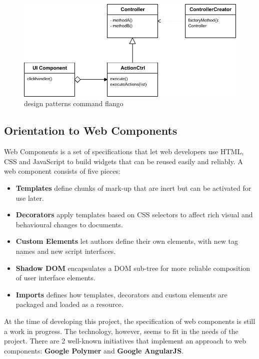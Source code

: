 \begin{figure}[htb]
    \centering
    \includegraphics{figures/design-patterns-command-flango.pdf}
    \caption{design patterns command flango}
    \label{fig:context-original}
\end{figure}

\subsection{Orientation to Web Components}
Web Components is a set of specifications that let web developers use \ac{HTML}, \ac{CSS} and JavaScript to build widgets that can be reused easily and reliably.
A web component consists of five pieces\cite{W3CComponents:2013}:
\begin{itemize}
    \item \textbf{Templates} define chunks of mark-up that are inert but can be activated for use later.
    \item \textbf{Decorators} apply templates based on CSS selectors to affect rich visual and behavioural changes to documents.
    \item \textbf{Custom Elements} let authors define their own elements, with new tag names and new script interfaces.
    \item \textbf{Shadow DOM}  encapsulates a DOM sub-tree for more reliable composition of user interface elements.
    \item \textbf{Imports} defines how templates, decorators and custom elements are packaged and loaded as a resource.
\end{itemize}

At the time of developing this project, the specification of web components is still a work in progress.
The technology, however, seems to fit in the needs of the project.
There are 2 well-known initiatives that implement an approach to web components: \textbf{Google Polymer} and \textbf{Google AngularJS}.

